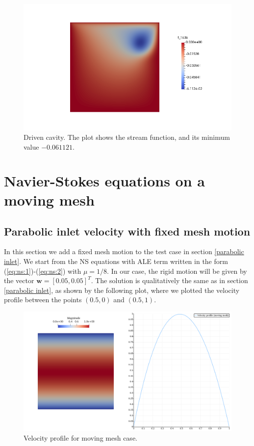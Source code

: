 \documentclass[a4paper,11pt,oneside]{book}
\begin{document}
\vspace{-.3cm}
\begin{figure}[h!]
\centering
\includegraphics[width=\textwidth]{images/mine.png}
\vspace{-1cm}
\caption{Driven cavity. The plot shows the stream function, and its minimum value $-0.061 121$.}
\end{figure}


\newpage

\section{Navier-Stokes equations on a moving mesh}
\subsection{Parabolic inlet velocity with fixed mesh motion}
In this section we add a fixed mesh motion to the test case in section \ref{parabolic inlet}. We start from the NS equations with ALE term written in the form (\ref{eq:ns:1})-(\ref{eq:ns:2}) with $\mu = 1/8$. In our case, the rigid motion will be given by the vector $\mathbf{w} = [0.05, 0.05]^T$. The solution is qualitatively the same as in section \ref{parabolic inlet}, as shown by the following plot, where we plotted the velocity profile between the points $(0.5, 0)$ and $(0.5, 1)$.

\begin{figure}[h]
\centering
\includegraphics[width=\textwidth]{images/velocity_moving.png}
\caption{Velocity profile for moving mesh case.}
\end{figure}
\end{document}
